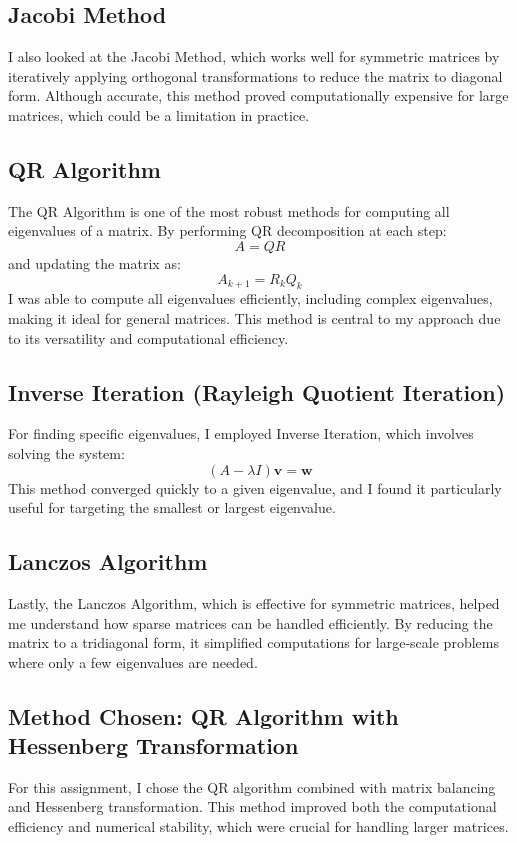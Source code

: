 \documentclass{article}
\begin{document}
\subsection{Jacobi Method}
I also looked at the Jacobi Method, which works well for symmetric matrices by iteratively applying orthogonal transformations to reduce the matrix to diagonal form. Although accurate, this method proved computationally expensive for large matrices, which could be a limitation in practice.

\subsection{QR Algorithm}
The QR Algorithm is one of the most robust methods for computing all eigenvalues of a matrix. By performing QR decomposition at each step:
$$
A = QR
$$
and updating the matrix as:
$$
A_{k+1} = R_k Q_k
$$
I was able to compute all eigenvalues efficiently, including complex eigenvalues, making it ideal for general matrices. This method is central to my approach due to its versatility and computational efficiency.

\subsection{Inverse Iteration (Rayleigh Quotient Iteration)}
For finding specific eigenvalues, I employed Inverse Iteration, which involves solving the system:
$$
(A - \lambda I) \mathbf{v} = \mathbf{w}
$$
This method converged quickly to a given eigenvalue, and I found it particularly useful for targeting the smallest or largest eigenvalue.

\subsection{Lanczos Algorithm}
Lastly, the Lanczos Algorithm, which is effective for symmetric matrices, helped me understand how sparse matrices can be handled efficiently. By reducing the matrix to a tridiagonal form, it simplified computations for large-scale problems where only a few eigenvalues are needed.

\subsection{Method Chosen: QR Algorithm with Hessenberg Transformation}
For this assignment, I chose the QR algorithm combined with matrix balancing and Hessenberg transformation. This method improved both the computational efficiency and numerical stability, which were crucial for handling larger matrices.
\end{document}
